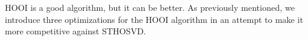     HOOI is a good algorithm, but it can be better. As previously mentioned, we
    introduce three optimizations for the HOOI algorithm in an attempt to make
    it more competitive against STHOSVD. 



